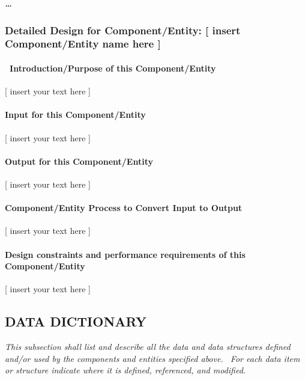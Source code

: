 \documentclass[twoside,letterpaper]{article}
\begin{document}
\subparagraph[{\dots}]{{\dots}}
\subsubsection{Detailed Design for Component/Entity: [ insert
Component/Entity name here ]}
\paragraph[\ Introduction/Purpose of this
Component/Entity]{\ Introduction/Purpose of this Component/Entity}
{\color{black}
[ insert your text here ]}

\paragraph{Input for this Component/Entity}
{\color{black}
[ insert your text here ]}

\paragraph{Output for this Component/Entity}
{\color{black}
[ insert your text here ]}

\paragraph{Component/Entity Process to Convert Input to Output}
{\color{black}
[ insert your text here ]}

\paragraph{Design constraints and performance requirements of this
Component/Entity}
{\color{black}
[ insert your text here ]}

\subsection{DATA DICTIONARY}
{\itshape\color{black}
This subsection shall list and describe all the data and data structures
defined and/or used by the components and entities specified above.
\ For each data item or structure indicate where it is defined,
referenced, and modified.}
\end{document}
